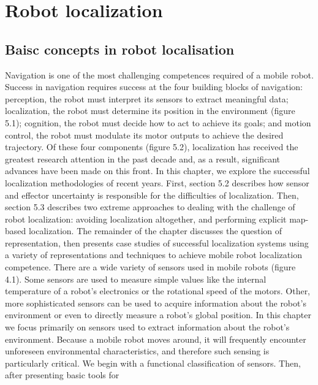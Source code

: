 \chapter{Robot localization}

\section{Baisc concepts in robot localisation}
Navigation is one of the most challenging competences required of a mobile robot. Success
in navigation requires success at the four building blocks of navigation: perception, the
robot must interpret its sensors to extract meaningful data; localization, the robot must
determine its position in the environment (figure 5.1); cognition, the robot must decide how
to act to achieve its goals; and motion control, the robot must modulate its motor outputs to
achieve the desired trajectory.
Of these four components (figure 5.2), localization has received the greatest research
attention in the past decade and, as a result, significant advances have been made on this
front. In this chapter, we explore the successful localization methodologies of recent years.
First, section 5.2 describes how sensor and effector uncertainty is responsible for the 
difficulties of localization. Then, section 5.3 describes two extreme approaches to dealing with
the challenge of robot localization: avoiding localization altogether, and performing
explicit map-based localization. The remainder of the chapter discusses the question of
representation, then presents case studies of successful localization systems using a variety of
representations and techniques to achieve mobile robot localization competence.
There are a wide variety of sensors used in mobile robots (figure 4.1). Some sensors are
used to measure simple values like the internal temperature of a robot’s electronics or the
rotational speed of the motors. Other, more sophisticated sensors can be used to acquire
information about the robot’s environment or even to directly measure a robot’s global
position. In this chapter we focus primarily on sensors used to extract information about the
robot’s environment. Because a mobile robot moves around, it will frequently encounter
unforeseen environmental characteristics, and therefore such sensing is particularly critical.
We begin with a functional classification of sensors. Then, after presenting basic tools for
